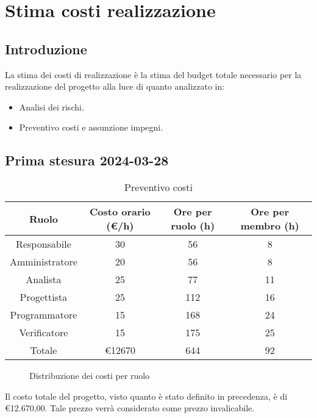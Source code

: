 \section{Stima costi realizzazione}
\subsection{Introduzione}
La stima dei costi di realizzazione è la stima del budget totale necessario per la realizzazione del progetto alla luce di quanto analizzato in:
\begin{itemize}
    \item Analisi dei rischi.
    \item Preventivo costi e assunzione impegni.
\end{itemize}

\subsection{Prima stesura 2024-03-28}

\begin{table}[!h]
	\centering
		\begin{tabular}{ |c|c|c|c| }
			\hline
			\textbf{Ruolo}   & \textbf{Costo orario (€/h)} & \textbf{Ore per ruolo (h)} & \textbf{Ore per membro (h)} \\
			\hline
			Responsabile   & 30           & 56            & 8              \\
			Amministratore & 20           & 56            & 8              \\
			Analista       & 25           & 77            & 11             \\
			Progettista    & 25           & 112           & 16             \\
			Programmatore  & 15           & 168           & 24             \\
			Verificatore   & 15           & 175           & 25             \\
			\hline
			Totale         & €12670       & 644           & 92             \\
			\hline
		\end{tabular}
        \caption{Preventivo costi}
    \label{tab:2}
\end{table}


\begin{figure*}
    \centering
    \caption{Distribuzione dei costi per ruolo}
    \label{fig:1}
    \end{figure*}

Il costo totale del progetto, visto quanto è stato definito in precedenza, è di €12.670,00. Tale prezzo verrà considerato come prezzo invalicabile. 
\newpage
